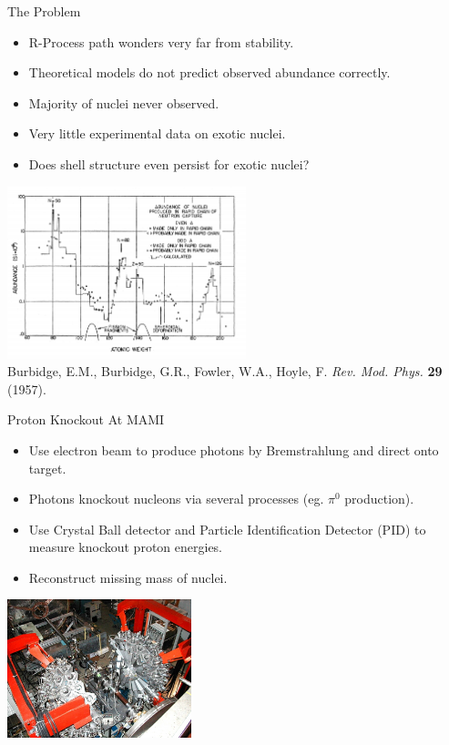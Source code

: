 \documentclass{beamer}
\begin{document}

\begin{frame}{The Problem}

\begin{itemize}
    \item R-Process path wonders very far from stability.
    \item Theoretical models do not predict observed abundance correctly.
    \item Majority of nuclei never observed.
    \item Very little experimental data on exotic nuclei.
    \item Does shell structure even persist for exotic nuclei?
\end{itemize}

\centering
\includegraphics[height =5cm]{Abundances}
     \\{\tiny Burbidge, E.M., Burbidge, G.R., Fowler, W.A., Hoyle, F. \textit{Rev. Mod. Phys.} \textbf{29} (1957).}

\end{frame}



\begin{frame}{Proton Knockout At MAMI}
\begin{itemize}
    \item Use electron beam to produce photons by Bremstrahlung and direct onto target.
    \item Photons knockout nucleons via several processes (eg. $\pi^{0}$ production).
    \item Use Crystal Ball detector and Particle Identification Detector (PID) to measure knockout proton energies.
    \item Reconstruct missing mass of nuclei.
\end{itemize}

    \includegraphics[height = 4cm, right]{openCB}

\end{frame}
\end{document}

